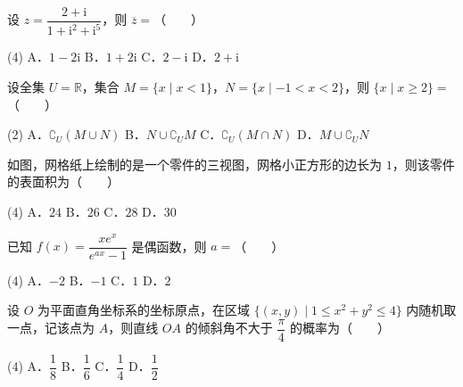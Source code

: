 

\par\medskip


\begin{question}
设 $z=\dfrac{2+\mathrm i}{1+\mathrm i^2+\mathrm i^5}$，则 $\overline z=$\mbox{（　　）}

\begin{gkopts}(4)
\task A．$1-2\mathrm i$
\task B．$1+2\mathrm i$
\task C．$2-\mathrm i$
\task D．$2+\mathrm i$
\end{gkopts}

\end{question}
\begin{question}
设全集 $U=\mathbb R$，集合 $M=\{x\mid x<1\}$，$N=\{x\mid -1<x<2\}$，则 $\{x\mid x\geqslant2\}=$\mbox{（　　）}

\begin{gkopts}(2)
\task A．$\complement_U(M\cup N)$
\task B．$N\cup\complement_U M$
\task C．$\complement_U(M\cap N)$
\task D．$M\cup\complement_U N$
\end{gkopts}

\Needspace{0.4\textheight}
\end{question}
\begin{question}
如图，网格纸上绘制的是一个零件的三视图，网格小正方形的边长为 $1$，则该零件的表面积为\mbox{（　　）}
\nopagebreak[4]
\begin{center}\end{center}
\nopagebreak[4]
\begin{gkopts}(4)
\task A．$24$
\task B．$26$
\task C．$28$
\task D．$30$
\end{gkopts}

\end{question}
\begin{question}
已知 $f(x)=\dfrac{xe^x}{e^{ax}-1}$ 是偶函数，则 $a=$\mbox{（　　）}

\begin{gkopts}(4)
\task A．$-2$
\task B．$-1$
\task C．$1$
\task D．$2$
\end{gkopts}

\end{question}
\begin{question}
设 $O$ 为平面直角坐标系的坐标原点，在区域 $\{(x,y)\mid 1\leqslant x^2+y^2\leqslant4\}$ 内随机取一点，记该点为 $A$，则直线 $OA$ 的倾斜角不大于 $\dfrac\pi4$ 的概率为\mbox{（　　）}

\begin{gkopts}(4)
\task A．$\dfrac18$
\task B．$\dfrac16$
\task C．$\dfrac14$
\task D．$\dfrac12$
\end{gkopts}

\end{question}
